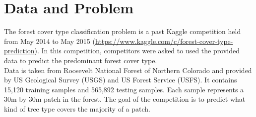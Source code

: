 \documentclass[11pt]{article}
\begin{document}


\tableofcontents
\thispagestyle{empty}
\cleardoublepage


\newpage
\setcounter{page}{1}


\singlespace

\section{Data and Problem}

The forest cover type classification problem is a past Kaggle competition held from May 2014 to May 2015 (\href{https://www.kaggle.com/c/forest-cover-type-prediction}{https://www.kaggle.com/c/forest-cover-type-prediction}). In this competition, competitors were asked to used the provided data to predict the predominant forest cover type. \\

\noindent Data is taken from Roosevelt National Forest of Northern Colorado and provided by US Geological Survey (USGS) and US Forest Service (USFS). It contains 15,120 training samples and 565,892 testing samples. Each sample represents a 30m by 30m patch in the forest. The goal of the competition is to predict what kind of tree type covers the majority of a patch. \\
\end{document}
